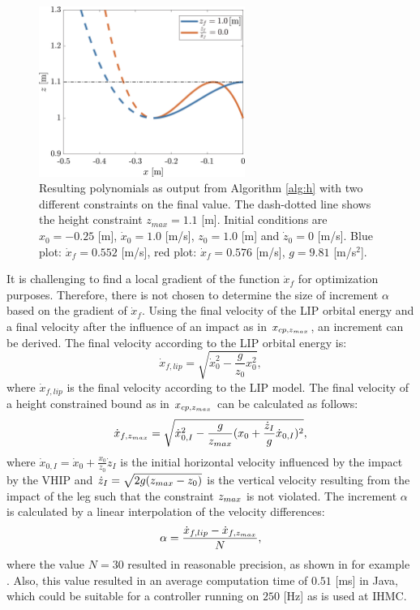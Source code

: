 \begin{figure}
\centering
\includegraphics[width=0.6\textwidth]{STYLESTUFF/polynomialHeightViz.png}
\caption{Resulting polynomials as output from Algorithm \ref{alg:h} with two different constraints on the final value. The dash-dotted line shows the height constraint $z_{max}=1.1$ [m]. Initial conditions are $x_0=-0.25$ [m], $\dot{x}_0=1.0$ [m/s], $z_0=1.0$ [m] and $\dot{z}_0=0$ [m/s]. Blue plot: $\dot{x}_f=0.552$ [m/s], red plot: $\dot{x}_f=0.576$ [m/s], $g=9.81$ [m/s$^2$]. }
\label{fig:polheight}
\end{figure}

It is challenging to find a local gradient of the function $\dot{x}_f$ for optimization purposes. Therefore, there is not chosen to determine the size of increment $\alpha$ based on the gradient of $\dot{x}_f$. Using the final velocity of the \ac{LIP} orbital energy and a final velocity after the influence of an impact as in $x_{cp,z_{max}}$, an increment can be derived. 
The final velocity according to the \ac{LIP} orbital energy is:
\begin{equation}
	\dot{x}_{f,lip} = \sqrt{\dot{x}_0^2-\frac{g}{z_0}x_0^2},
\end{equation}
where $\dot{x}_{f,lip}$ is the final velocity according to the \ac{LIP} model. The final velocity of a height constrained bound as in $x_{cp,z_{max}}$ can be calculated as follows:
\begin{equation}
	\dot{x}_{f,z_{max}} = \sqrt{\dot{x}_{0,I}^2-\frac{g}{z_{max}}(x_0+\frac{\dot{z}_I}{g}\dot{x}_{0,I})^2},
\end{equation}
where $\dot{x}_{0,I}=\dot{x}_0 + \frac{x_0}{z_0}\dot{z}_I$ is the initial horizontal velocity influenced by the impact by the \ac{VHIP} and $\dot{z}_I = \sqrt{2g(z_{max}-z_0)}$ is the vertical velocity resulting from the impact of the leg such that the constraint $z_{max}$ is not violated. The increment $\alpha$ is calculated by a linear interpolation of the velocity differences:
\begin{equation}
	\alpha =\frac{\dot{x}_{f,lip} -\dot{x}_{f,z_{max}}}{N},
\end{equation}
where the value $N=30$ resulted in reasonable precision, as shown in for example . Also, this value resulted in an average computation time of $0.51$ [ms] in Java, which could be suitable for a controller running on $250$ [Hz] as is used at \ac{IHMC}.

